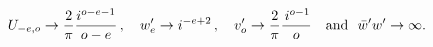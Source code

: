 \begin{equation}
U_{-e,o}\rightarrow \frac{2}{\pi }\frac{i^{o-e-1}}{o-e}\,,\quad
w_{e}^{\prime }\rightarrow i^{-e+2}\,,\quad v_{o}^{\prime }\rightarrow \frac{%
2}{\pi }\frac{\,i^{o-1}}{o}\quad \mbox{and }\ \bar{w}^{\prime }w^{\prime
}\rightarrow \infty .  \label{limit}
\end{equation}%
